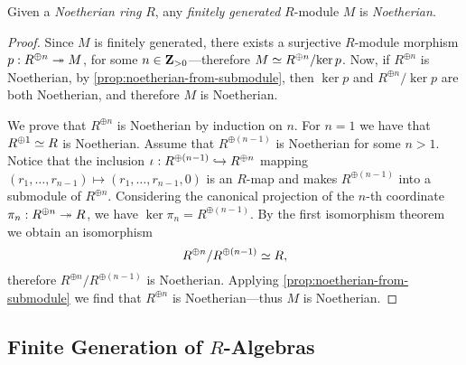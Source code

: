 \begin{corollary}
\label{cor:noetherian-ring-fg-module-is-noetherian}
Given a \emph{Noetherian ring} \(R\), any \emph{finitely generated} \(R\)-module
\(M\) is \emph{Noetherian}.
\end{corollary}

\begin{proof}
Since \(M\) is finitely generated, there exists a surjective \(R\)-module
morphism \(p: R^{\oplus n} \twoheadrightarrow M\), for some \(n \in \mathbf{Z}_{> 0}\)---therefore
\(M \simeq R^{\oplus n}/{\ker p}\). Now, if \(R^{\oplus n}\) is Noetherian, by
\cref{prop:noetherian-from-submodule}, then \(\ker p\) and \(R^{\oplus n}/{\ker
  p}\) are both Noetherian, and therefore \(M\) is Noetherian.

We prove that \(R^{\oplus n}\) is Noetherian by induction on \(n\). For
\(n = 1\) we have that \(R^{\oplus 1} \simeq R\) is Noetherian. Assume that
\(R^{\oplus(n - 1)}\) is Noetherian for some \(n > 1\). Notice that the
inclusion \(\iota: R^{\oplus (n-1)} \hookrightarrow R^{\oplus n}\) mapping
\((r_1, \dots, r_{n-1}) \mapsto (r_1, \dots, r_{n-1}, 0)\) is an \(R\)-map and
makes \(R^{\oplus (n-1)}\) into a submodule of \(R^{\oplus n}\). Considering the
canonical projection of the \(n\)-th coordinate \(\pi_n: R^{\oplus n} \twoheadrightarrow R\),
we have \(\ker \pi_n = R^{\oplus (n - 1)}\). By the first isomorphism theorem we
obtain an isomorphism
\[
R^{\oplus n}/R^{\oplus (n-1)} \simeq R,
\]
therefore \(R^{\oplus n}/R^{\oplus (n-1)}\) is Noetherian. Applying
\cref{prop:noetherian-from-submodule} we find that \(R^{\oplus n}\) is
Noetherian---thus \(M\) is Noetherian.
\end{proof}

\subsection{Finite Generation of \texorpdfstring{\(R\)}{R}-Algebras}

